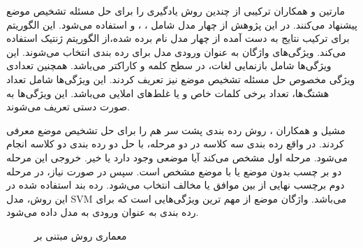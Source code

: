 مارتین و همکاران
\cite{tutek-etal-2016-takelab}
ترکیبی از چندین روش یادگیری را برای حل مسئله تشخیص موضع پیشنهاد می‌کنند. در این پژوهش از چهار مدل شامل 
، 
، 
 و 
استفاده می‌شود. این الگوریتم برای ترکیب نتایج به دست آمده از چهار مدل نام برده شده،از الگوریتم ژنتیک استفاده می‌کند. ویژگی‌های واژگان به عنوان ورودی مدل برای ردە بندی انتخاب می‌شوند. این ویژگی‌ها شامل بازنمایی لغات،
در سطح کلمه و کاراکتر می‌باشد. همچنین تعدادی ویژگی مخصوص حل مسئله تشخیص موضع نیز تعریف کردند. این ویژگی‌ها شامل تعداد هشتگ‌ها، تعداد برخی کلمات خاص و یا غلط‌های املایی می‌باشد. این ویژگی‌ها به صورت دستی تعریف می‌شوند.


	مشیل و همکاران
	\cite{wojatzki-zesch-2016-ltl}،
	روش ردە بندی پشت سر هم
	را برای حل تشخیص موضع معرفی کردند. در واقع ردە بندی سه کلاسه در دو مرحله، با حل دو ردە بندی دو کلاسه انجام می‌شود. مرحله اول مشخص می‌کند آیا موضعی وجود دارد یا خیر. خروجی این مرحله دو بر چسب بدون موضع 
	یا با موضع مشخص
است. سپس در صورت نیاز، در مرحله دوم برچسب نهایی از بین موافق یا مخالف انتخاب می‌شود. ردە بند استفاده شده در این روش، مدل
 SVM
 می‌باشد. واژگان موضع
  از مهم ترین ویژگی‌هایی است که برای ردە بندی به عنوان ورودی به مدل داده می‌شود.
  \begin{figure}
  	\caption[معماری روش مبتنی بر 
  	]{معماری روش مبتنی بر 
  		\cite{wojatzki-zesch-2016-ltl} \label{StackedClassifier}}
  	
  \end{figure}

